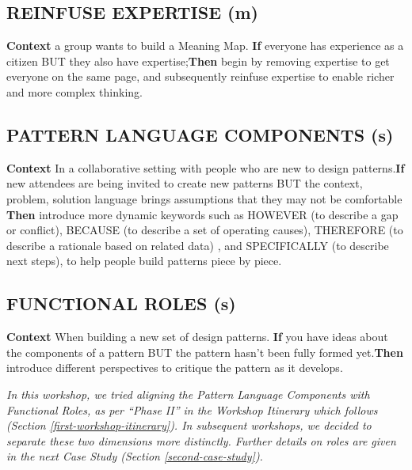 \documentclass[acmlarge,timestamp]{acmart}
\newcommand{\sensory}{(s)}
\newcommand{\motor}{(m)}
\begin{document}
\subsection*{REINFUSE EXPERTISE {\hfill \motor}}

\textbf{Context} a group wants to build a {\sc Meaning Map}.\newline
\textbf{If} everyone has experience as a citizen BUT they also have
expertise;\newline \textbf{Then} begin by removing expertise to get
everyone on the same page, and subsequently reinfuse expertise to
enable richer and more complex thinking.\newline\smallskip

\subsection*{PATTERN LANGUAGE COMPONENTS {\hfill \sensory}}

\textbf{Context} In a collaborative setting with people who are new to
design patterns.\newline \textbf{If} new attendees are being invited
to create new patterns BUT the context, problem, solution language
brings assumptions that they may not be comfortable \newline \textbf{Then}
introduce more dynamic keywords such as HOWEVER (to describe a gap or
conflict), BECAUSE (to describe a set of operating causes), THEREFORE
(to describe a rationale based on related data) , and SPECIFICALLY (to
describe next steps), to help people build patterns piece by piece.

\subsection*{FUNCTIONAL ROLES {\hfill \sensory}}

\textbf{Context} When building a new set of design patterns.\newline
\textbf{If} you have ideas about the components of a pattern BUT the
pattern hasn’t been fully formed yet.\newline \textbf{Then} introduce
different perspectives to critique the pattern as it
develops.

\smallskip

\noindent \emph{In this workshop, we tried aligning the {\sc Pattern
  Language Components} with {\sc Functional Roles}, as per “Phase II”
in the Workshop Itinerary which follows (Section
\ref{first-workshop-itinerary}).  In subsequent workshops, we decided
to separate these two dimensions more distinctly.  Further details on
roles are given in the next Case Study (Section
\ref{second-case-study}).}
\end{document}
